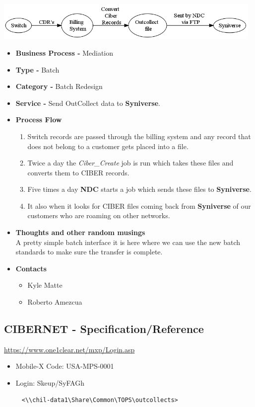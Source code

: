 \documentclass[12pt,twoside]{article}
\begin{document}
    \includegraphics[width=13cm]{Pictures/outcoll.png}
\begin{itemize}
\item \textbf{Business Process -} Mediation
\item \textbf{Type -} Batch
\item \textbf{Category -} Batch Redesign
\item \textbf{Service -}  Send OutCollect data to \textbf{Syniverse}.
\item \textbf{Process Flow}
\begin{enumerate}
\item Switch records are passed through the billing system and any
        record that does not belong to a customer gets placed into a file.
\item Twice a day the \emph{Ciber\_Create} job is run which takes these
        files and converts them to CIBER records.
\item Five times a day \textbf{NDC} starts a job which sends these files to
        \textbf{Syniverse}.
\item It also when it looks for CIBER files coming back from
        \textbf{Syniverse} of our customers who are roaming on other networks.
\end{enumerate}
\item \textbf{Thoughts and other random musings} \\ A pretty simple batch
     interface it is here where we can use the new batch standards to
     make sure the transfer is complete.
\item \textbf{Contacts}
\begin{itemize}
\item Kyle Matte
\item Roberto Amezcua
\end{itemize}
\end{itemize}
\subsection{CIBERNET - Specification/Reference}
\label{sec-6-9}

   \href{https://www.one1clear.net/mxp/Login.asp}{https://www.one1clear.net/mxp/Login.asp}
\begin{itemize}
\item Mobile-X Code: USA-MPS-0001
\item Login: Skeup/SyFAGh
\end{itemize}
\begin{verbatim}
     <\\chil-data1\Share\Common\TOPS\outcollects>
\end{verbatim}
\end{document}
